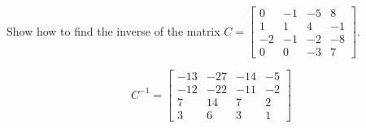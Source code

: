 
\begin{exerciseStatement}


Show how to find the inverse of the matrix \(C= \left[\begin{array}{cccc}
0 & -1 & -5 & 8 \\
1 & 1 & 4 & -1 \\
-2 & -1 & -2 & -8 \\
0 & 0 & -3 & 7
\end{array}\right] \).


\end{exerciseStatement}
    
\begin{exerciseAnswer} 
\[C^{-1}= \left[\begin{array}{cccc}
-13 & -27 & -14 & -5 \\
-12 & -22 & -11 & -2 \\
7 & 14 & 7 & 2 \\
3 & 6 & 3 & 1
\end{array}\right] \]
\end{exerciseAnswer}
    

